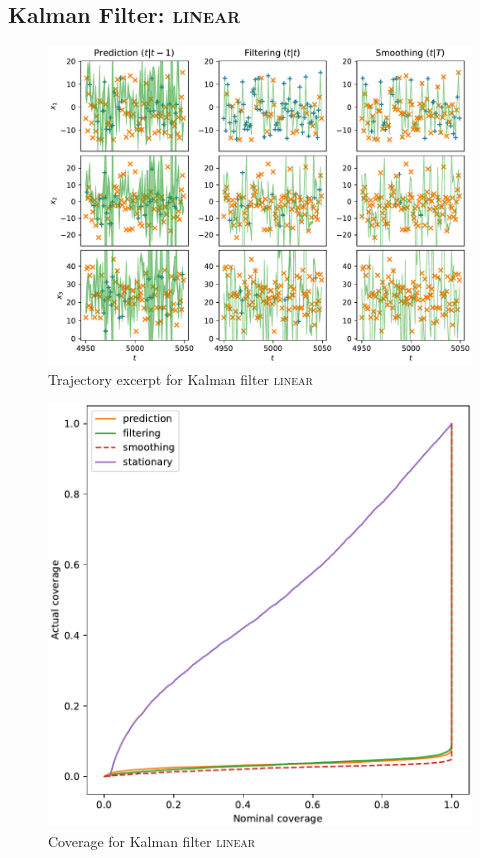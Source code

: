 \subsection{Kalman Filter: {\textsc{linear}}}
\begin{figure}[H]
\begin{center}
\includegraphics[width=\linewidth]{generated/trajectory/Method.LINEAR-Recalibrate.NO.pdf}
\end{center}
\caption{Trajectory excerpt for Kalman filter \textsc{{\textsc{linear}}}}
\end{figure}
\begin{figure}[H]
\begin{center}
\includegraphics[width=\linewidth]{generated/coverage/Method.LINEAR-Recalibrate.NO.pdf}
\end{center}
\caption{Coverage for Kalman filter \textsc{{\textsc{linear}}}}
\end{figure}
